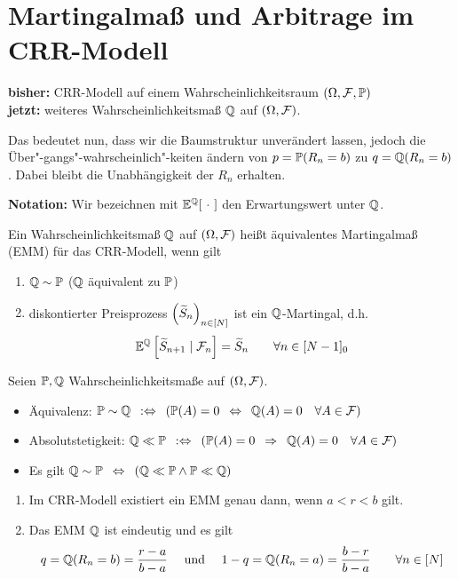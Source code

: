 \section{Martingalmaß und Arbitrage im CRR-Modell}

\textbf{bisher:} CRR-Modell auf einem Wahrscheinlichkeitsraum $(\Omega, \F, \P)$ \\
\textbf{jetzt:} weiteres Wahrscheinlichkeitsmaß $\Q$ auf $(\Omega, \F)$.

Das bedeutet nun, dass wir die Baumstruktur unverändert lassen, jedoch die Über"-gangs"-wahrscheinlich"-keiten ändern von $p = \P(R_n = b)$ zu $q = \Q(R_n = b)$. Dabei bleibt die Unabhängigkeit der $R_n$ erhalten.

\textbf{Notation:} Wir bezeichnen mit $\E^\Q[\ \cdot \ ]$ den Erwartungswert unter $\Q$.

\begin{*definition}
	Ein Wahrscheinlichkeitsmaß $\Q$ auf $(\Omega, \F)$ heißt äquivalentes Martingalmaß (EMM) für das CRR-Modell, wenn gilt
	\begin{enumerate}
		\item $\Q \sim \P$ ($\Q$ äquivalent zu $\P$)
		\item diskontierter Preisprozess $\folge{\schlange{S}_n}{n \in [N]}$ ist ein $\Q$-Martingal, d.h.
		\begin{equation*}
		\E^\Q \sqbrackets{\schlange{S}_{n+1} \mid \F_n} = \schlange{S}_n \qquad \forall n \in [N-1]_0
		\end{equation*}
	\end{enumerate}
\end{*definition}

\begin{*bemerkung}
	Seien $\P, \Q$ Wahrscheinlichkeitsmaße auf $(\Omega, \F)$.
	\begin{itemize}
		\item Äquivalenz: $\P \sim \Q \defequiv \brackets{\P(A) = 0 \equivalent \Q(A) = 0 \quad \forall A \in \F}$
		\item Absolutstetigkeit: $\Q \ll \P  \defequiv \brackets{\P(A) = 0 \follows \Q(A) = 0 \quad \forall A \in \F}$
		\item Es gilt $\Q \sim \P \equivalent \brackets{\Q \ll \P \land \P \ll \Q}$
	\end{itemize}
\end{*bemerkung}

\begin{theorem}
	\begin{enumerate}[label=(\alph*)]
		\item Im CRR-Modell existiert ein EMM genau dann, wenn $a < r < b$ gilt.
		\item Das EMM $\Q$ ist eindeutig und es gilt
		\begin{align*}
			q = \Q(R_n = b) = \frac{r-a}{b-a} \quad \und \quad 1-q = \Q(R_n = a) = \frac{b-r}{b-a} \qquad \forall n \in [N]
		\end{align*}
	\end{enumerate}
\end{theorem}


